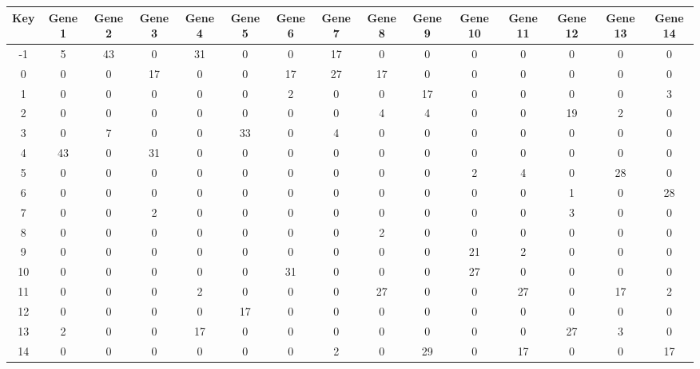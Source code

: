 \begin{tabular}{|c|c|c|c|c|c|c|c|c|c|c|c|c|c|c|}
\hline
Key & Gene 1 & Gene 2 & Gene 3 & Gene 4 & Gene 5 & Gene 6 & Gene 7 & Gene 8 & Gene 9 & Gene 10 & Gene 11 & Gene 12 & Gene 13 & Gene 14 \\
\hline
-1 & 5 & 43 & 0 & 31 & 0 & 0 & 17 & 0 & 0 & 0 & 0 & 0 & 0 & 0 \\
0 & 0 & 0 & 17 & 0 & 0 & 17 & 27 & 17 & 0 & 0 & 0 & 0 & 0 & 0 \\
1 & 0 & 0 & 0 & 0 & 0 & 2 & 0 & 0 & 17 & 0 & 0 & 0 & 0 & 3 \\
2 & 0 & 0 & 0 & 0 & 0 & 0 & 0 & 4 & 4 & 0 & 0 & 19 & 2 & 0 \\
3 & 0 & 7 & 0 & 0 & 33 & 0 & 4 & 0 & 0 & 0 & 0 & 0 & 0 & 0 \\
4 & 43 & 0 & 31 & 0 & 0 & 0 & 0 & 0 & 0 & 0 & 0 & 0 & 0 & 0 \\
5 & 0 & 0 & 0 & 0 & 0 & 0 & 0 & 0 & 0 & 2 & 4 & 0 & 28 & 0 \\
6 & 0 & 0 & 0 & 0 & 0 & 0 & 0 & 0 & 0 & 0 & 0 & 1 & 0 & 28 \\
7 & 0 & 0 & 2 & 0 & 0 & 0 & 0 & 0 & 0 & 0 & 0 & 3 & 0 & 0 \\
8 & 0 & 0 & 0 & 0 & 0 & 0 & 0 & 2 & 0 & 0 & 0 & 0 & 0 & 0 \\
9 & 0 & 0 & 0 & 0 & 0 & 0 & 0 & 0 & 0 & 21 & 2 & 0 & 0 & 0 \\
10 & 0 & 0 & 0 & 0 & 0 & 31 & 0 & 0 & 0 & 27 & 0 & 0 & 0 & 0 \\
11 & 0 & 0 & 0 & 2 & 0 & 0 & 0 & 27 & 0 & 0 & 27 & 0 & 17 & 2 \\
12 & 0 & 0 & 0 & 0 & 17 & 0 & 0 & 0 & 0 & 0 & 0 & 0 & 0 & 0 \\
13 & 2 & 0 & 0 & 17 & 0 & 0 & 0 & 0 & 0 & 0 & 0 & 27 & 3 & 0 \\
14 & 0 & 0 & 0 & 0 & 0 & 0 & 2 & 0 & 29 & 0 & 17 & 0 & 0 & 17 \\
\hline
\end{tabular}